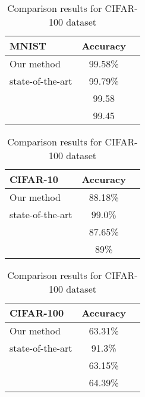 \documentclass{article}
\begin{document}
\begin{table}
\parbox{.3\linewidth}{
\centering
\caption{Comparison results for MNIST dataset}
\label{tab:comarResultsMNIST}
\begin{small}
\begin{tabular}{lcc}
MNIST & Accuracy\\
\toprule
Our method &99.58\% & \\
state-of-the-art \cite{wan2013regularization}& 99.79\%\\
\cite{xu2015multi} &99.58\\
\cite{goodfellow2013maxout}&99.45\\
\bottomrule
\end{tabular}
\end{small}
}
\hfill
\parbox{.3\linewidth}{
\centering
\caption{Comparison results for CIFAR-10 dataset}
\label{tab:comarResultsCifar10}
\begin{small}
\begin{tabular}{lcc}
CIFAR-10 & Accuracy\\
\toprule
Our method &88.18\% & \\
state-of-the-art \cite{huang2018gpipe}& 99.0\%\\
\cite{visin2015renet} &87.65\%\\
\cite{krizhevsky2012imagenet}&89\%\\
\bottomrule
\end{tabular}
\end{small}
}
\hfill
\parbox{.3\linewidth}{
\centering
\caption{Comparison results for CIFAR-100 dataset}
\label{tab:comarResultsCifar100}
\begin{small}
\begin{tabular}{lcc}
CIFAR-100 & Accuracy\\
\toprule
Our method &63.31\% & \\
state-of-the-art \cite{huang2018gpipe}& 91.3\%\\
\cite{srivastava2013discriminative} &63.15\%\\
\cite{lin2013network}&64.39\%\\
\bottomrule
\end{tabular}
\end{small}
}
\end{table}
\end{document}
